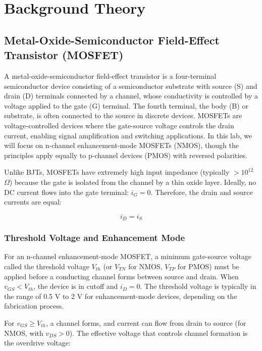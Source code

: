 \documentclass[10pt]{article}
\begin{document}
\section{Background Theory}

\subsection{Metal-Oxide-Semiconductor Field-Effect Transistor (MOSFET)}

A metal-oxide-semiconductor field-effect transistor is a four-terminal semiconductor device consisting of a semiconductor substrate with source (S) and drain (D) terminals connected by a channel, whose conductivity is controlled by a voltage applied to the gate (G) terminal. The fourth terminal, the body (B) or substrate, is often connected to the source in discrete devices.  MOSFETs are voltage-controlled devices where the gate-source voltage controls the drain current, enabling signal amplification and switching applications. In this lab, we will focus on n-channel enhancement-mode MOSFETs (NMOS), though the principles apply equally to p-channel devices (PMOS) with reversed polarities.

Unlike BJTs, MOSFETs have extremely high input impedance (typically $>10^{12}$ $\Omega$) because the gate is isolated from the channel by a thin oxide layer.  Ideally, no DC current flows into the gate terminal:  $i_G = 0$. Therefore, the drain and source currents are equal: 

\begin{equation}
    i_D = i_S
    \label{eq:kcl_mos}
\end{equation}

\subsubsection{Threshold Voltage and Enhancement Mode}

For an n-channel enhancement-mode MOSFET, a minimum gate-source voltage called the threshold voltage $V_{th}$ (or $V_{TN}$ for NMOS, $V_{TP}$ for PMOS) must be applied before a conducting channel forms between source and drain. When $v_{GS} < V_{th}$, the device is in cutoff and $i_D = 0$.  The threshold voltage is typically in the range of 0.5 V to 2 V for enhancement-mode devices, depending on the fabrication process.

For $v_{GS} \geq V_{th}$, a channel forms, and current can flow from drain to source (for NMOS, with $v_{DS} > 0$). The effective voltage that controls channel formation is the overdrive voltage: 
\end{document}

